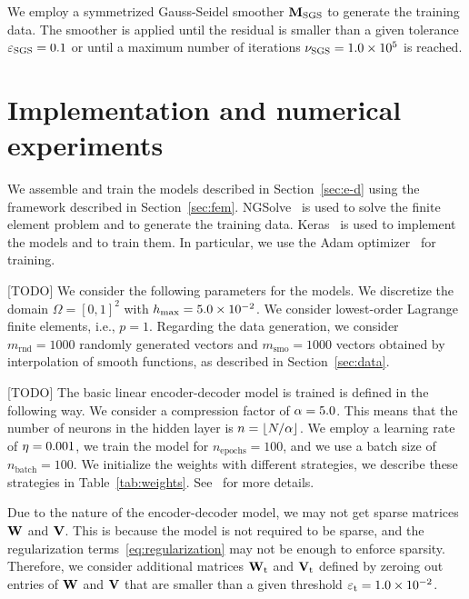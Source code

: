 We employ a symmetrized Gauss-Seidel smoother \(\mathbf{M}_{\mathrm{SGS}}\) to generate the training data.
The smoother is applied until the residual is smaller than a given tolerance \(\varepsilon_{\mathrm{SGS}} = 0.1\) or until a maximum number of iterations \(\nu_{\mathrm{SGS}} = 1.0 \times 10^5\) is reached.

\section{Implementation and numerical experiments}

We assemble and train the models described in Section~\ref{sec:e-d} using the framework described in Section~\ref{sec:fem}.
NGSolve~\cite{schoberl2014c++} is used to solve the finite element problem and to generate the training data.
Keras~\cite{chollet2015keras} is used to implement the models and to train them.
In particular, we use the Adam optimizer~\cite{kingma2014adam} for training.

[TODO]
We consider the following parameters for the models.
We discretize the domain \(\Omega = [0,1]^2\) with \(h_{\max} = 5.0 \times 10^{-2}\).
We consider lowest-order Lagrange finite elements, i.e., \(p = 1\).
Regarding the data generation, we consider \(m_\mathrm{rnd} = 1000\) randomly generated vectors and \(m_\mathrm{smo} = 1000\) vectors obtained by interpolation of smooth functions, as described in Section~\ref{sec:data}.

[TODO]
The basic linear encoder-decoder model is trained is defined in the following way.
We consider a compression factor of \(\alpha = 5.0\).
This means that the number of neurons in the hidden layer is \(n = \lfloor N/\alpha \rfloor\).
We employ a learning rate of \(\eta = 0.001\), we train the model for \(n_\mathrm{epochs} = 100\), and we use a batch size of \(n_\mathrm{batch} = 100\).
We initialize the weights with different strategies, we describe these strategies in Table~\ref{tab:weights}.
See~\cite{chollet2015keras, glorot2010understanding} for more details.

Due to the nature of the encoder-decoder model, we may not get sparse matrices \(\mathbf{W}\) and \(\mathbf{V}\).
This is because the model is not required to be sparse, and the regularization terms~\eqref{eq:regularization} may not be enough to enforce sparsity.
Therefore, we consider additional matrices \(\mathbf{W}_\mathrm{t}\) and \(\mathbf{V}_\mathrm{t}\) defined by zeroing out entries of \(\mathbf{W}\) and \(\mathbf{V}\) that are smaller than a given threshold \(\varepsilon_{\mathrm{t}} = 1.0 \times 10^{-2}\).

